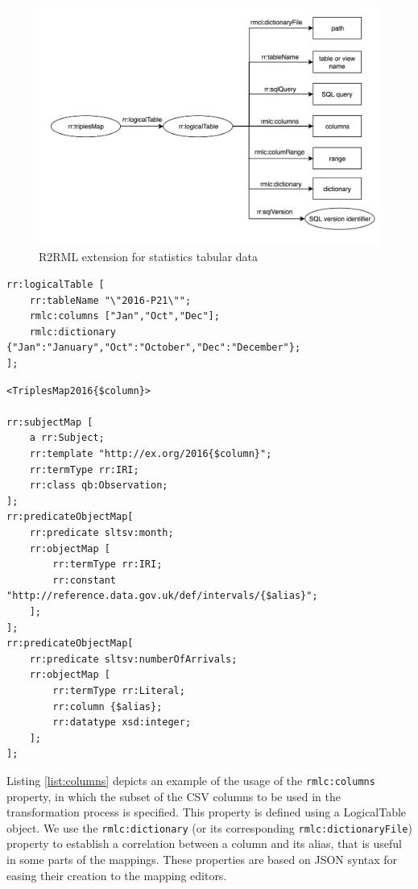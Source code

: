 \begin{figure}[h]
  \centering
  \includegraphics[width=1.0\linewidth]{figures/rmlc-iterator.png}
  \caption{R2RML extension for statistics tabular data}
  \label{fig:rmlc}
\end{figure}

\begin{lstlisting}[float,caption=Columns and dictionary properties in R2RML-Iterator,frame=tlrb,label={list:columns}, columns=fullflexible]
rr:logicalTable [
    rr:tableName "\"2016-P21\"";
    rmlc:columns ["Jan","Oct","Dec"];
    rmlc:dictionary {"Jan":"January","Oct":"October","Dec":"December"};
];
\end{lstlisting}

\begin{lstlisting}[float,caption=Iterator variables in the extension,frame=tlrb,label={list:iterator}, columns=fullflexible]
<TriplesMap2016{$column}>

rr:subjectMap [
    a rr:Subject;
    rr:template "http://ex.org/2016{$column}";
    rr:termType rr:IRI;
    rr:class qb:Observation;
];
rr:predicateObjectMap[
	rr:predicate sltsv:month;
    rr:objectMap [
    	rr:termType rr:IRI;
        rr:constant "http://reference.data.gov.uk/def/intervals/{$alias}";
    ];
];
rr:predicateObjectMap[
    rr:predicate sltsv:numberOfArrivals;
    rr:objectMap [
        rr:termType rr:Literal;
        rr:column {$alias};
        rr:datatype xsd:integer;
    ];
];
\end{lstlisting}


Listing \ref{list:columns} depicts an example of the usage of the \texttt{rmlc:columns} property, in which the subset of the CSV columns to be used in the transformation process is specified. This property is defined using a LogicalTable object. We use the \texttt{rmlc:dictionary} (or its corresponding \texttt{rmlc:dictionaryFile}) property to establish a correlation between a column and its alias, that is useful in some parts of the mappings. These properties are based on JSON syntax for easing their creation to the mapping editors.


